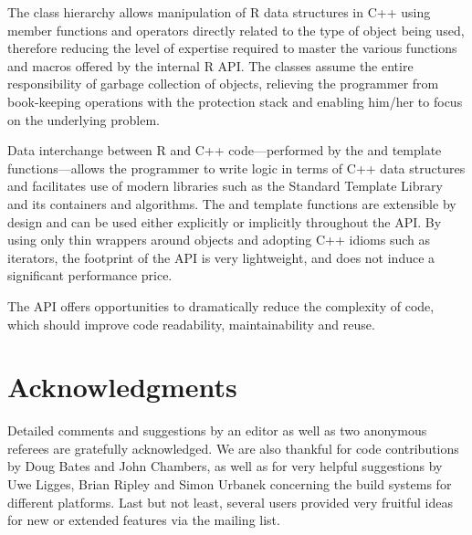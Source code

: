 The class hierarchy allows manipulation of R data structures in C++ 
using member functions and operators directly related to the type
of object being used, therefore reducing the level of expertise
required to master the various functions and macros offered by the
internal R API. The classes assume the entire 
responsibility of garbage collection of objects, relieving the 
programmer from book-keeping operations with the protection stack 
and enabling him/her to focus on the underlying problem. 

Data interchange between R and C++ code---performed by the  and
 template functions---allows the programmer to write logic in terms
of C++ data structures and facilitates use of modern libraries such as the
Standard Template Library and its containers and algorithms. The
 and  template functions are extensible by design and
can be used either explicitly or implicitly throughout the API.
By using only thin wrappers around  objects and adopting C++
idioms such as iterators, the footprint of the  API 
is very lightweight, and does not induce a significant performance price. 

The  API offers opportunities to dramatically reduce the complexity
of code, which should improve code readability, maintainability and reuse.

\section{Acknowledgments}

Detailed comments and suggestions by an editor as well as two anonymous referees
are gratefully acknowledged.  We are also thankful for code contributions by
Doug Bates and John Chambers, as well as for very helpful suggestions by Uwe
Ligges, Brian Ripley and Simon Urbanek concerning the build systems for different
platforms.   Last but not least, several users provided very fruitful
ideas for new or extended features via the  mailing list.



\address{Dirk Eddelbuettel\\
  Debian Project\\
  Chicago, IL\\
  USA}\\

\address{Romain Fran\c{c}ois\\
  Professional R Enthusiast\\
  1 rue du Puits du Temple, 34 000 Montpellier\\
  FRANCE}\\

